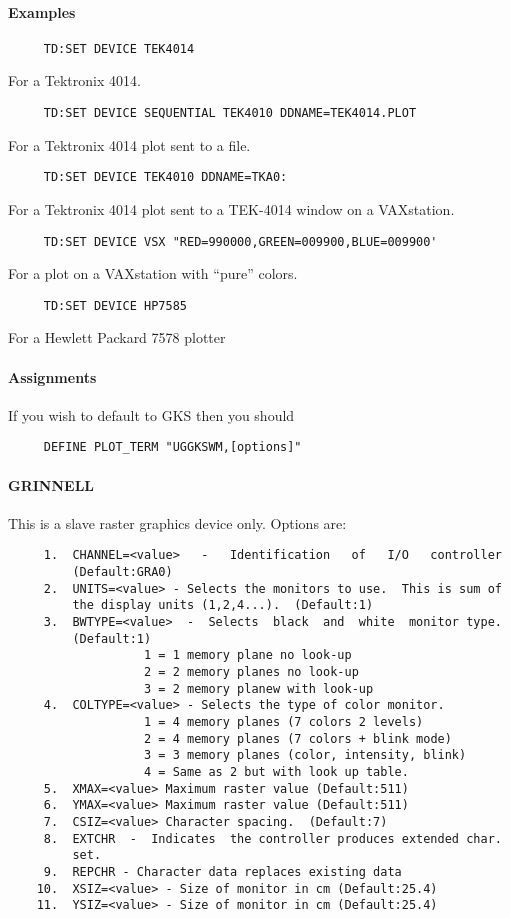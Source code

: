 \paragraph{Examples}
\begin{verbatim}
     TD:SET DEVICE TEK4014 
\end{verbatim}
For a Tektronix 4014.  
\begin{verbatim}
     TD:SET DEVICE SEQUENTIAL TEK4010 DDNAME=TEK4014.PLOT 
\end{verbatim}
For a Tektronix 4014 plot sent to a file.  
\begin{verbatim}
     TD:SET DEVICE TEK4010 DDNAME=TKA0:  
\end{verbatim}
For  a  Tektronix  4014  plot  sent  to  a  TEK-4014  window  on  a
VAXstation.  
\begin{verbatim}
     TD:SET DEVICE VSX "RED=990000,GREEN=009900,BLUE=009900' 
\end{verbatim}
For a plot on a VAXstation with ``pure'' colors.  
\begin{verbatim}
     TD:SET DEVICE HP7585 
\end{verbatim}
For a Hewlett Packard 7578 plotter 
\paragraph{Assignments}
If you wish to default to GKS then you should 
\begin{verbatim}
     DEFINE PLOT_TERM "UGGKSWM,[options]" 
\end{verbatim}
\paragraph{GRINNELL}
This is a slave raster graphics device only.  Options are:  
\begin{verbatim}
     1.  CHANNEL=<value>   -   Identification   of   I/O   controller
         (Default:GRA0) 
     2.  UNITS=<value> - Selects the monitors to use.  This is sum of
         the display units (1,2,4...).  (Default:1) 
     3.  BWTYPE=<value>  -  Selects  black  and  white  monitor type.
         (Default:1) 
                   1 = 1 memory plane no look-up 
                   2 = 2 memory planes no look-up 
                   3 = 2 memory planew with look-up 
     4.  COLTYPE=<value> - Selects the type of color monitor.  
                   1 = 4 memory planes (7 colors 2 levels) 
                   2 = 4 memory planes (7 colors + blink mode) 
                   3 = 3 memory planes (color, intensity, blink) 
                   4 = Same as 2 but with look up table.  
     5.  XMAX=<value> Maximum raster value (Default:511) 
     6.  YMAX=<value> Maximum raster value (Default:511) 
     7.  CSIZ=<value> Character spacing.  (Default:7) 
     8.  EXTCHR  -  Indicates  the controller produces extended char.
         set.  
     9.  REPCHR - Character data replaces existing data 
    10.  XSIZ=<value> - Size of monitor in cm (Default:25.4) 
    11.  YSIZ=<value> - Size of monitor in cm (Default:25.4) 
\end{verbatim}

